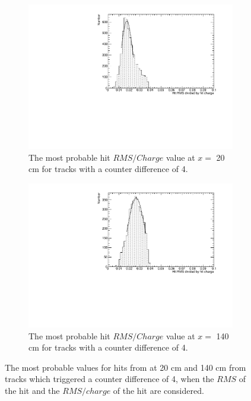 \begin{figure}[h!]
\begin{subfigure}{0.45\textwidth}
    \includegraphics[width=\textwidth]{DataCan_2}
    \caption{The most probable hit $RMS/Charge$ value at $x =$ 20 cm for tracks with a counter difference of 4.}
  \end{subfigure}
  \hspace{0.08\textwidth}
  \begin{subfigure}{0.45\textwidth}
    \centering
    \includegraphics[width=\textwidth]{DataCan_3}
    \caption{The most probable hit $RMS/Charge$ value at $x =$ 140 cm for tracks with a counter difference of 4.}
  \end{subfigure}
  \caption[The most probable values of the $RMS$ and $RMS/Charge$ distributions for tracks with a counter difference of 4 in the 35 ton data]
          {The most probable values for hits from at 20 cm and 140 cm from tracks which triggered a counter difference of 4, when the $RMS$ of the hit and the $RMS/charge$ of the hit are considered.}
          \label{fig:DiffDataHitFit}
\end{figure}

